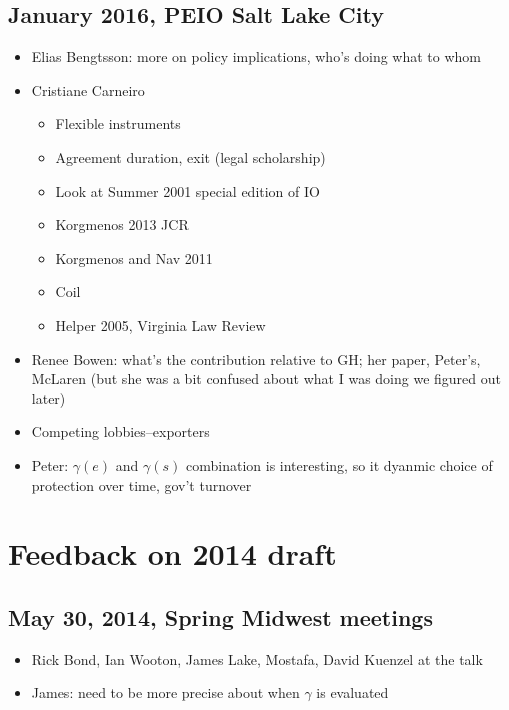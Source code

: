 \documentclass[12pt]{article}
\newcommand{\ga}{\gamma}
\begin{document}
\newpage
\subsection{January 2016, PEIO Salt Lake City}
\begin{itemize}
	\item Elias Bengtsson: more on policy implications, who's doing what to whom
	\item Cristiane Carneiro
		\begin{itemize}
			\item Flexible instruments
			\item Agreement duration, exit (legal scholarship)
			\item Look at Summer 2001 special edition of IO
			\item Korgmenos 2013 JCR
			\item Korgmenos and Nav 2011
			\item Coil
			\item Helper 2005, Virginia Law Review
		\end{itemize}
	\item Renee Bowen: what's the contribution relative to GH; her paper, Peter's, McLaren (but she was a bit confused about what I was doing we figured out later)
	\item Competing lobbies--exporters
	\item Peter: $\ga(e)$ and $\ga(s)$ combination is interesting, so it dyanmic choice of protection over time, gov't turnover
\end{itemize}

\newpage
\section{Feedback on 2014 draft}
\subsection{May 30, 2014, Spring Midwest meetings}
\begin{itemize}
	\item Rick Bond, Ian Wooton, James Lake, Mostafa, David Kuenzel at the talk
	\item James: need to be more precise about when $\ga$ is evaluated
\end{itemize}

\newpage
\end{document}
